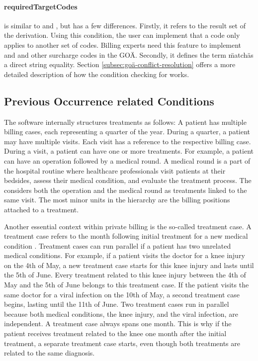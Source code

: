 \paragraph{requiredTargetCodes}\label{par:requiredTargetCodes}
\requiredTargetCodes is similar to  and , but has a few differences.
Firstly, it refers to the result set of the derivation.
Using this condition, the user can implement that a code only applies to another set of codes.
Billing experts need this feature to implement  and  and other surcharge codes in the GOÄ.
Secondly, it defines the term \"match\" as a direct string equality.
Section \ref{subsec:goä-conflict-resolution} offers a more detailed description of how the condition checking for  works.

\subsection{Previous Occurrence related Conditions}\label{subsec:previous-occurrence-related}

The software internally structures treatments as follows:
A patient has multiple billing cases, each representing a quarter of the year.
During a quarter, a patient may have multiple visits.
Each visit has a reference to the respective billing case.
During a visit, a patient can have one or more treatments.
For example, a patient can have an operation followed by a medical round.
A medical round is a part of the hospital routine where healthcare professionals visit patients at their bedsides,
assess their medical condition, and evaluate the treatment process.
The \AVS considers both the operation and the medical round as treatments linked to the same visit.
The most minor units in the hierarchy are the billing positions attached to a treatment.

Another essential context within private billing is the so-called treatment case.
A treatment case refers to the month following initial treatment for a new medical condition \cite{bruck1998kommentar}.
Treatment cases can run parallel if a patient has two unrelated medical conditions.
For example, if a patient visits the doctor for a knee injury on the 4th of May, a new treatment case starts for this knee injury and lasts until the 5th of June.
Every treatment related to this knee injury between the 4th of May and the 5th of June belongs to this treatment case.
If the patient visits the same doctor for a viral infection on the 10th of May, a second treatment case begins, lasting until the 11th of June.
Two treatment cases run in parallel because both medical conditions, the knee injury, and the viral infection, are independent.
A treatment case always spans one month.
This is why if the patient receives treatment related to the knee one month after the initial treatment, a separate treatment case starts, even though both treatments are related to the same diagnosis.

